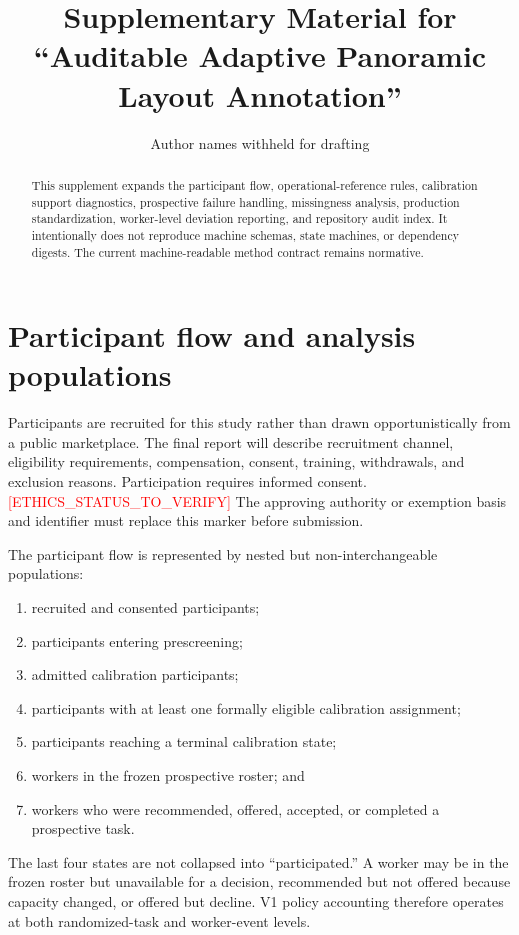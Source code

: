 \documentclass[preprint,12pt]{elsarticle}
\newcommand{\ethicsverify}{\textcolor{red}{[ETHICS\_STATUS\_TO\_VERIFY]}}
\begin{document}
\begin{frontmatter}
\title{Supplementary Material for ``Auditable Adaptive Panoramic Layout Annotation''}
\author{Author names withheld for drafting}
\begin{abstract}
This supplement expands the participant flow, operational-reference rules, calibration support diagnostics, prospective failure handling, missingness analysis, production standardization, worker-level deviation reporting, and repository audit index. It intentionally does not reproduce machine schemas, state machines, or dependency digests. The current machine-readable method contract remains normative.
\end{abstract}
\end{frontmatter}

\section{Participant flow and analysis populations}
\label{sup:flow}

Participants are recruited for this study rather than drawn opportunistically from a public marketplace. The final report will describe recruitment channel, eligibility requirements, compensation, consent, training, withdrawals, and exclusion reasons. Participation requires informed consent. \ethicsverify{} The approving authority or exemption basis and identifier must replace this marker before submission.

The participant flow is represented by nested but non-interchangeable populations:

\begin{enumerate}
  \item recruited and consented participants;
  \item participants entering prescreening;
  \item admitted calibration participants;
  \item participants with at least one formally eligible calibration assignment;
  \item participants reaching a terminal calibration state;
  \item workers in the frozen prospective roster; and
  \item workers who were recommended, offered, accepted, or completed a prospective task.
\end{enumerate}

The last four states are not collapsed into ``participated.'' A worker may be in the frozen roster but unavailable for a decision, recommended but not offered because capacity changed, or offered but decline. V1 policy accounting therefore operates at both randomized-task and worker-event levels.
\end{document}
